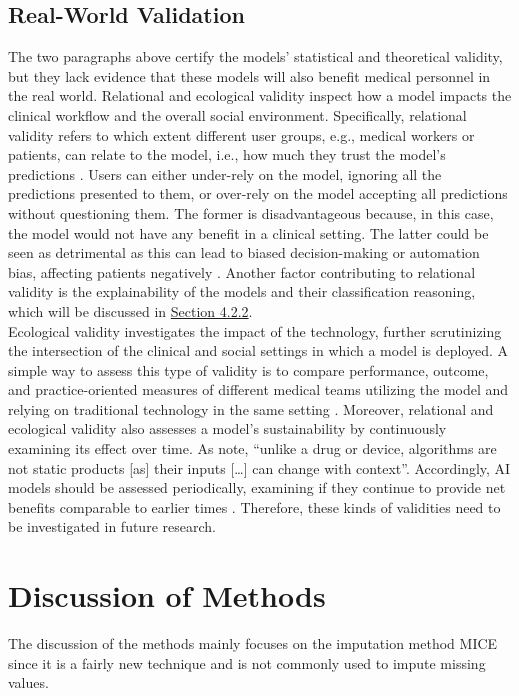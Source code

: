 \subsection{Real-World Validation}
The two paragraphs above certify the models' statistical and theoretical 
validity, but they lack evidence that these models will also benefit medical 
personnel in the real world. Relational and ecological validity inspect how a 
model impacts the clinical workflow and the overall social environment. 
Specifically, relational validity refers to which extent different user groups, 
e.g., medical workers or patients, can relate to the model, i.e., how much they 
trust the model's predictions \cite{RN151}. Users can either under-rely on 
the model, ignoring all the predictions presented to them, or over-rely on the 
model accepting all predictions without questioning them. The former is 
disadvantageous because, in this case, the model would not have any benefit in 
a clinical setting. The latter could be seen as detrimental as this can lead to 
biased decision-making or automation bias, affecting patients 
negatively \cite{RN151, RN152}. Another factor contributing to relational 
validity is the explainability of the models and their classification reasoning, 
which will be discussed in \hyperref[sec:classifiers]{Section 4.2.2}.
\\
Ecological validity investigates the impact of the technology, further 
scrutinizing the intersection of the clinical and social settings in which a 
model is deployed. A simple way to assess this type of validity is to compare 
performance, outcome, and practice-oriented measures of different medical 
teams utilizing the model and relying on traditional technology in the same 
setting \cite{RN152}. Moreover, relational and ecological validity also 
assesses a model's sustainability by continuously examining its 
effect over time. As \citeauthor{RN198} \cite{RN198} note, ``unlike a drug or 
device, algorithms are not static products [as] their inputs […] can change 
with context''. Accordingly, AI models should be assessed periodically, 
examining if they continue to provide net benefits comparable to earlier times 
\cite{RN152}. Therefore, these kinds of validities need to be investigated in 
future research.
\section{Discussion of Methods}
The discussion of the methods mainly focuses on the imputation method MICE 
since it is a fairly new technique and is not commonly used to impute missing 
values.
